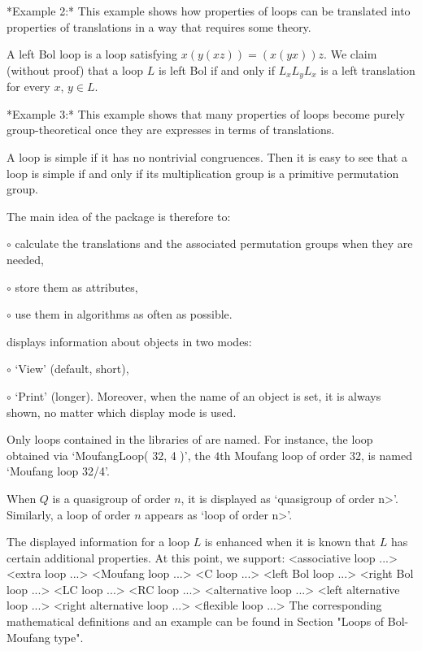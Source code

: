 *Example 2:* This example shows how properties of loops can be translated into
properties of translations in a way that requires some theory.

A left Bol loop is a loop satisfying $x(y(xz)) = (x(yx))z$. We claim (without
proof) that a loop $L$ is left Bol if and only if $L_xL_yL_x$ is a left
translation for every $x$, $y\in L$.

*Example 3:* This example shows that many properties of loops become purely
group-theoretical once they are expresses in terms of translations.

A loop is simple if it has no nontrivial congruences. Then it is easy to see
that a loop is simple if and only if its multiplication group is a primitive
permutation group.

\medskip

The main idea of the package is therefore to:
\beginlist%
\item{$\circ$} calculate the translations and the associated permutation
    groups when they are needed,
\item{$\circ$} store them as attributes,
\item{$\circ$} use them in algorithms as often as possible.
\endlist


{\GAP} displays information about objects in two modes:
\beginlist%
\item{$\circ$}
    `View' (default, short),
\item{$\circ$}
    `Print' (longer).
\endlist
Moreover, when the name of an object is set, it is always shown, no matter
which display mode is used.

Only loops contained in the libraries of {\LOOPS} are named. For instance, the
loop obtained via `MoufangLoop( 32, 4 )', the $4$th Moufang loop of order $32$,
is named `Moufang loop 32/4'.

When $Q$ is a quasigroup of order $n$, it is displayed as `\<quasigroup of
order n>'. Similarly, a loop of order $n$ appears as `\<loop of order n>'.

The displayed information for a loop $L$ is enhanced when it is known that $L$
has certain additional properties. At this point, we support:
\begintt
    <associative loop ...>
    <extra loop ...>
    <Moufang loop ...>
    <C loop ...>
    <left Bol loop ...>
    <right Bol loop ...>
    <LC loop ...>
    <RC loop ...>
    <alternative loop ...>
    <left alternative loop ...>
    <right alternative loop ...>
    <flexible loop ...>
\endtt
The corresponding mathematical definitions and an example can be found in
Section "Loops of Bol-Moufang type".

